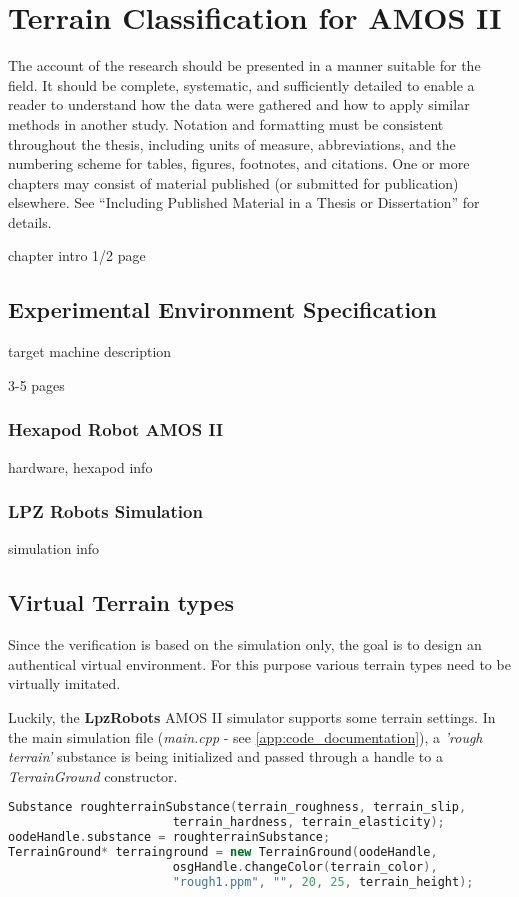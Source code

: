 \chapter{Terrain Classification for AMOS II}
\label{chapter:05:terrain_classification}

The account of the research should be presented in a manner suitable for the field. It should be complete, systematic, and sufficiently detailed to enable a reader to understand how the data were gathered and how to apply similar methods in another study. Notation and formatting must be consistent throughout the thesis, including units of measure, abbreviations, and the numbering scheme for tables, figures, footnotes, and citations. One or more chapters may consist of material published (or submitted for publication) elsewhere. See “Including Published Material in a Thesis or Dissertation” for details.

chapter intro
1/2 page

\section{Experimental Environment Specification}
target machine description

3-5 pages

\subsection{Hexapod Robot AMOS II}
hardware, hexapod info

\subsection{LPZ Robots Simulation}
simulation info

\section{Virtual Terrain types}
Since the verification is based on the simulation only, the goal is to design an authentical virtual environment. For this purpose various terrain types need to be virtually imitated.

Luckily, the \textbf{LpzRobots} AMOS II simulator supports some terrain settings. In the main simulation file (\textit{main.cpp} - see \ref{app:code_documentation}), a \textit{'rough terrain'} substance is being initialized and passed through a handle to a \textit{TerrainGround} constructor.

\begin{lstlisting}[language=C++, caption={Setting a terrain ground in main.cpp}, label=code:terrain_ground]
Substance roughterrainSubstance(terrain_roughness, terrain_slip,
                       terrain_hardness, terrain_elasticity);
oodeHandle.substance = roughterrainSubstance;
TerrainGround* terrainground = new TerrainGround(oodeHandle, 
                       osgHandle.changeColor(terrain_color),
                       "rough1.ppm", "", 20, 25, terrain_height);
\end{lstlisting}

